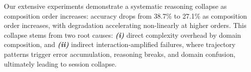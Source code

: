 Our extensive experiments demonstrate a systematic reasoning collapse as composition order increases: accuracy drops from 38.7\% to 27.1\% as composition order increases, with degradation accelerating non-linearly at higher orders. This collapse stems from two root causes: \textbf{\textit{(i)}} direct complexity overhead by domain composition, and \textbf{\textit{(ii)}} indirect interaction-amplified failures, where trajectory patterns trigger error accumulation, reasoning breaks, and domain confusion, ultimately leading to session collapse.







